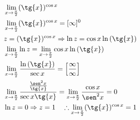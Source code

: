 \begin{ex}
\begin{align}
&\lim_{x\rightarrow \frac{\pi}{2}} (\tg{x})^{\cos{x}}\nonumber\\
&\lim_{x\rightarrow \frac{\pi}{2}} (\tg{x})^{\cos{x}} = [\infty]^0\nonumber\\
& z=(\tg{x})^{\cos{x}} \Rightarrow \ln{z}=\cos{x}\ln{(\tg{x})}\nonumber\\
&\lim_{x\rightarrow \frac{\pi}{2}} \ln{z}=\lim_{x\rightarrow \frac{\pi}{2}} \cos{x}\ln{(\tg{x})}\nonumber\\
&\lim_{x\rightarrow \frac{\pi}{2}} \frac{\ln{(\tg{x})}}{\sec{x}}=\left[\frac{\infty}{\infty}\right]\nonumber\\
&\lim_{x\rightarrow \frac{\pi}{2}} \frac{\frac{\sen^2{x}}{\tg{x}}}{\sec{x}\tg{x}}=\lim_{x\rightarrow \frac{\pi}{2}} \frac{\cos{x}}{\sen^2{x}}=0\nonumber\\
&\ln{z}=0 \Rightarrow z = 1 \quad \therefore \lim_{x\rightarrow \frac{\pi}{2}} (\tg{x})^{\cos{x}}=1\nonumber
\end{align}
\end{ex}
